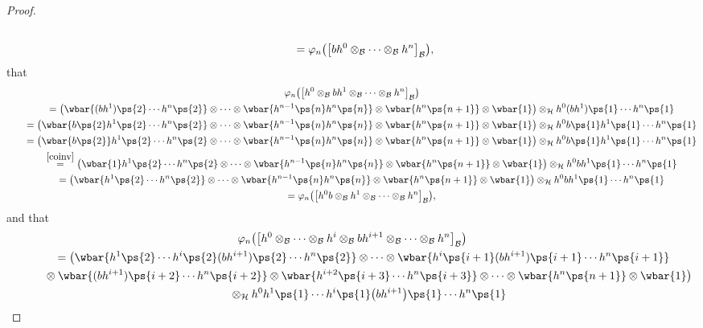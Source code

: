 \begin{proof}
\begin{gather*}
\\
\qquad{}
=\varphi_n\big(\big[bh^0\otimes_{\cal B}\cdots\otimes_{\cal B} h^n\big]_{\cal B}\big),
\end{gather*}
that
\begin{gather*}
\varphi_n\big(\big[h^0\otimes_{\cal B} bh^{1}\otimes_{\cal B}\cdots\otimes_{\cal B} h^n\big]_{\cal B}\big)
\\
\qquad
=\big(\wbar{(bh^1)\ps{2}\cdots h^n\ps{2}} \otimes\cdots\otimes \wbar{h^{n-1}\ps{n}h^n\ps{n}} \otimes \wbar{h^n\ps{n+1}}
\otimes \wbar{1}\big) \otimes_{\cal H} h^0(bh^1)\ps{1}\cdots h^n\ps{1}
\\
\qquad
=\big(\wbar{b\ps{2}h^1\ps{2}\cdots h^n\ps{2}} \otimes\cdots\otimes \wbar{h^{n-1}\ps{n}h^n\ps{n}} \otimes
\wbar{h^n\ps{n+1}} \otimes \wbar{1}\big) \otimes_{\cal H} h^0b\ps{1}h^1\ps{1}\cdots h^n\ps{1}
\\
\qquad
=\big(\wbar{b\ps{2}}h^1\ps{2}\cdots h^n\ps{2} \otimes\cdots\otimes \wbar{h^{n-1}\ps{n}h^n\ps{n}} \otimes
\wbar{h^n\ps{n+1}} \otimes \wbar{1}\big) \otimes_{\cal H} h^0b\ps{1}h^1\ps{1}\cdots h^n\ps{1}
\\
\qquad
\stackrel{\eqref{coinv}}{=}
\big(\wbar{1}h^1\ps{2}\cdots h^n\ps{2} \otimes\cdots\otimes \wbar{h^{n-1}\ps{n}h^n\ps{n}} \otimes \wbar{h^n\ps{n+1}}
\otimes \wbar{1}\big) \otimes_{\cal H} h^0bh^1\ps{1}\cdots h^n\ps{1}
\\
\qquad
=\big(\wbar{h^1\ps{2}\cdots h^n\ps{2}} \otimes\cdots\otimes \wbar{h^{n-1}\ps{n}h^n\ps{n}} \otimes \wbar{h^n\ps{n+1}}
\otimes \wbar{1}\big) \otimes_{\cal H} h^0bh^1\ps{1}\cdots h^n\ps{1}
\\
\qquad
=\varphi_n\big(\big[h^0b\otimes_{\cal B} h^{1}\otimes_{\cal B}\cdots\otimes_{\cal B} h^n\big]_{\cal B}\big),
\end{gather*}
and that
\begin{gather*}
\varphi_n\big(\big[h^0\otimes_{\cal B}\cdots\otimes_{\cal B} h^i\otimes_{\cal B} bh^{i+1}\otimes_{\cal
B}\dots\otimes_{\cal B} h^n\big]_{\cal B}\big)
\\
\qquad
=\big(\wbar{h^1\ps{2}\cdots h^i\ps{2}(bh^{i+1})\ps{2}\cdots h^n\ps{2}}\otimes\dots\otimes
\wbar{h^i\ps{i+1}(bh^{i+1})\ps{i+1}\cdots h^n\ps{i+1}}
\\
\qquad\phantom{=}{}\otimes
\wbar{(bh^{i+1})\ps{i+2}\cdots h^n\ps{i+2}} \otimes \wbar{h^{i+2}\ps{i+3}\cdots
h^n\ps{i+3}}\otimes\cdots\otimes\wbar{h^n\ps{n+1}} \otimes \wbar{1}\big) \\
 \qquad\phantom{=}{}\otimes_{\cal H}
h^0h^1\ps{1}\cdots h^{i}\ps{1}\big(bh^{i+1}\big)\ps{1}\cdots h^n\ps{1}
\\

\end{gather*}
\end{proof}
